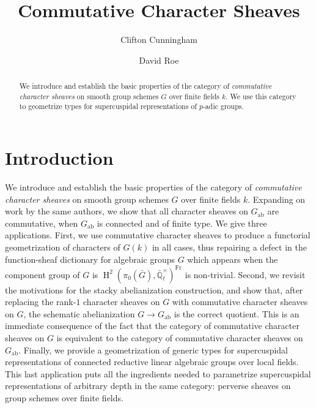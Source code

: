 \documentclass[10pt]{amsart}
\title[Commutative Character Sheaves]{Commutative Character Sheaves}
\author{Clifton Cunningham}
\author{David Roe}
\theoremstyle{plain}
\theoremstyle{definition}
\newcommand{\EE}{\mathbb{\bar Q}_\ell}
\newcommand{\Fq}{k}
\newcommand{\EEx}{\EE^\times}
\newcommand{\Frob}[1]{\operatorname{Fr}_{#1}}
\DeclareMathOperator{\Hh}{H}
\newcommand{\ab}{_{\operatorname{ab}}}
\newcommand{\bG}{\bar{G}}
\begin{document}
\begin{abstract}
We introduce and establish the basic properties of  the category of \emph{commutative character sheaves} on smooth group schemes $G$ over finite fields $\Fq$. 
We use this category to geometrize types for supercuspidal representations of $p$-adic groups. 
\end{abstract}

\maketitle

\tableofcontents

\section*{Introduction}
We introduce and establish the basic properties of  the category of \emph{commutative character sheaves} on smooth group schemes $G$ over finite fields $\Fq$. 
Expanding on work by the same authors, we show that all character sheaves on $G\ab$ are commutative, when $G\ab$ is connected and of finite type.
We give three applications.
First, we use commutative character sheaves to produce a functorial geometrization of characters of $G(\Fq)$ in all cases, thus repairing a defect in the function-sheaf dictionary for algebraic groups $G$ which appears when the component group of $G$ is $\Hh^2(\pi_0(\bG),\EEx)^{\Frob{}}$ is non-trivial. 
Second, we revisit the motivations for the stacky abelianization construction, and show that, after replacing the rank-$1$ character sheaves on $G$ with commutative character sheaves on $G$, the schematic abelianization $G \to G\ab$ is the correct quotient.
This is an immediate consequence of the fact that the category of commutative character sheaves on $G$ is equivalent to the category of commutative character sheaves on $G\ab$. 
Finally, we provide a geometrization of generic types for supercuspidal representations of connected reductive linear algebraic groups over local fields.
This last application puts all the ingredients needed to parametrize supercuspidal representations of arbitrary depth in the same category: perverse sheaves on group schemes over finite fields.
\end{document}

